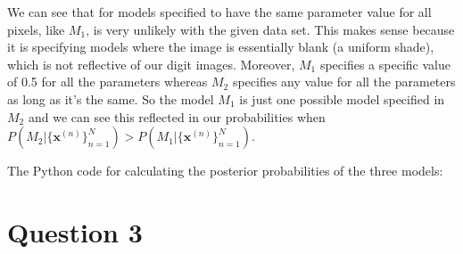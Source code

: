 \documentclass[12pt]{article}
\begin{document}
We can see that for models specified to have the same parameter value for all pixels, like $M_1$, is very unlikely with the given data set. This makes sense because it is specifying models where the image is essentially blank (a uniform shade), which is not reflective of our digit images. Moreover, $M_1$ specifies a specific value of 0.5 for all the parameters whereas $M_2$ specifies any value for all the parameters as long as it's the same. So the model $M_1$ is just one possible model specified in $M_2$ and we can see this reflected in our probabilities when $P(M_2|\{\textbf{x}^{(n)}\}_{n=1}^{N}) > P(M_1|\{\textbf{x}^{(n)}\}_{n=1}^{N})$.

\newpage
The Python code for calculating the posterior probabilities of the three models:

\newpage
\section*{Question 3}
\end{document}
